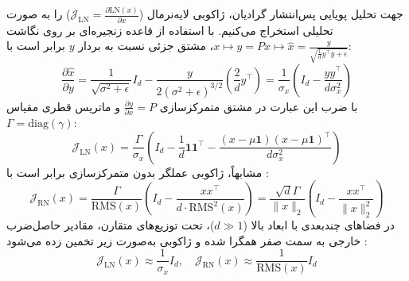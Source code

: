 جهت تحلیل پویایی پس‌انتشار گرادیان، ژاکوبی لایه‌نرمال ($\mathcal{J}_{\text{LN}} = \frac{\partial \text{LN}(x)}{\partial x}$) را به صورت تحلیلی استخراج می‌کنیم. با استفاده از قاعده زنجیره‌ای بر روی نگاشت $x \mapsto y = Px \mapsto \hat{x} = \frac{y}{\sqrt{\frac{1}{d}y^\top y + \epsilon}}$، مشتق جزئی نسبت به بردار $y$ برابر است با:
\begin{equation}
    \frac{\partial \hat{x}}{\partial y} = \frac{1}{\sqrt{\sigma^2 + \epsilon}} I_d - \frac{y}{2(\sigma^2 + \epsilon)^{3/2}} \left(\frac{2}{d}y^\top\right) = \frac{1}{\sigma_x} \left( I_d - \frac{yy^\top}{d\sigma_x^2} \right)
\end{equation}
با ضرب این عبارت در مشتق متمرکزسازی $\frac{\partial y}{\partial x} = P$ و ماتریس قطری مقیاس $\Gamma = \text{diag}(\gamma)$:
\begin{equation}
    \mathcal{J}_{\text{LN}}(x) = \frac{\Gamma}{\sigma_x} \left( I_d - \frac{1}{d}\mathbf{1}\mathbf{1}^\top - \frac{(x - \mu\mathbf{1})(x - \mu\mathbf{1})^\top}{d\sigma_x^2} \right)
\end{equation}
مشابهاً، ژاکوبی عملگر  بدون متمرکزسازی برابر است با \cite{budzinskiy2026numerical, qi2025dnt}:
\begin{equation}
    \mathcal{J}_{\text{RN}}(x) = \frac{\Gamma}{\text{RMS}(x)} \left( I_d - \frac{xx^\top}{d \cdot \text{RMS}^2(x)} \right) = \frac{\sqrt{d}\Gamma}{\|x\|_2} \left( I_d - \frac{xx^\top}{\|x\|_2^2} \right)
\end{equation}
در فضاهای چندبعدی با ابعاد بالا ($d \gg 1$)، تحت توزیع‌های متقارن، مقادیر حاصل‌ضرب خارجی به سمت صفر همگرا شده و ژاکوبی به‌صورت زیر تخمین زده می‌شود \cite{li2025mixln}:
\begin{equation}
    \mathcal{J}_{\text{LN}}(x) \approx \frac{1}{\sigma_x} I_d, \quad \mathcal{J}_{\text{RN}}(x) \approx \frac{1}{\text{RMS}(x)} I_d
\end{equation}

